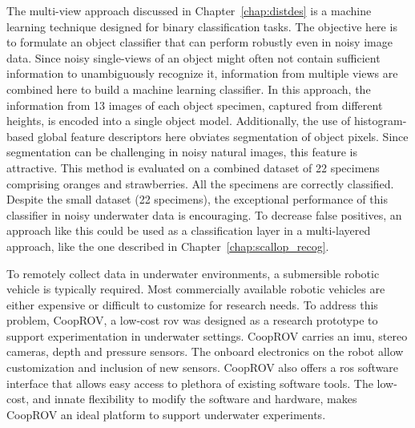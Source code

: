 The multi-view approach discussed in Chapter~\ref{chap:distdes} is a machine learning 
technique designed for binary classification tasks. 
The objective here is to formulate an object classifier that can perform robustly even in noisy image data.
Since noisy single-views of an object might often not contain sufficient information to unambiguously recognize it, information from multiple views are combined 
here to build a machine learning classifier. 
In this approach, the information from 13 images of each object specimen, captured from different heights, is encoded into a single object model.
Additionally, the use of histogram-based global feature descriptors here obviates segmentation of object pixels. Since segmentation can be challenging in noisy natural images, this feature is attractive. This method is evaluated on a combined dataset of 22 specimens comprising oranges and strawberries.
All the specimens are correctly classified. Despite the small dataset (22 specimens), the exceptional performance of this classifier in noisy underwater data is encouraging. To decrease false positives, an approach like this could be used as a classification layer in a multi-layered approach, like the one described in Chapter~\ref{chap:scallop_recog}.

To remotely collect data in underwater environments, a submersible robotic vehicle is typically required.
Most commercially available robotic vehicles are either expensive or difficult to customize for research needs. To address this problem, CoopROV, a low-cost \gls{rov} was designed as a research prototype to support experimentation in underwater settings. CoopROV carries an \gls{imu}, stereo cameras, depth and pressure sensors. The onboard electronics on the robot allow customization and inclusion of new sensors. CoopROV also offers a \gls{ros} software interface that allows easy access to plethora of existing software tools. The low-cost, and innate flexibility to modify the software and hardware, makes CoopROV an ideal platform to support underwater experiments.

